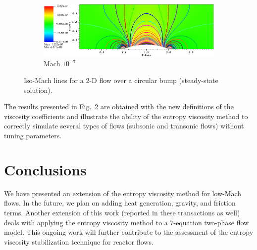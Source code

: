 \documentclass{anstrans}
\newcommand{\fig}[1]{Fig.~\ref{#1}}                      %
\begin{document}
\begin{figure}[H]
        \begin{subfigure}[b]{0.47\textwidth}
                \centering
                \includegraphics[width=\textwidth]{Hump2D_mach_1em7.png}
                \caption{Mach $10^{-7}$}
                \label{fig:2d_hump_mach_0p0000001}
        \end{subfigure}
        \caption{Iso-Mach lines for a 2-D flow over a circular bump (steady-state solution).}
				\label{fig:2d_hump}
\end{figure}
%
The results presented in \fig{fig:2d_hump} are obtained with the new definitions of the viscosity coefficients and illustrate the ability of the entropy viscosity method to correctly simulate several types of flows (subsonic and transonic flows) without tuning parameters. 


\section{Conclusions}

We have presented an extension of the entropy viscosity method for low-Mach flows. In the future, we plan on adding heat generation, gravity, and friction terms. Another extension of this work (reported in these transactions as well) deals with applying the entropy viscosity method to a 7-equation two-phase flow model. This ongoing work will further contribute to the assessment of the entropy viscosity stabilization technique for reactor flows.






\end{document}
